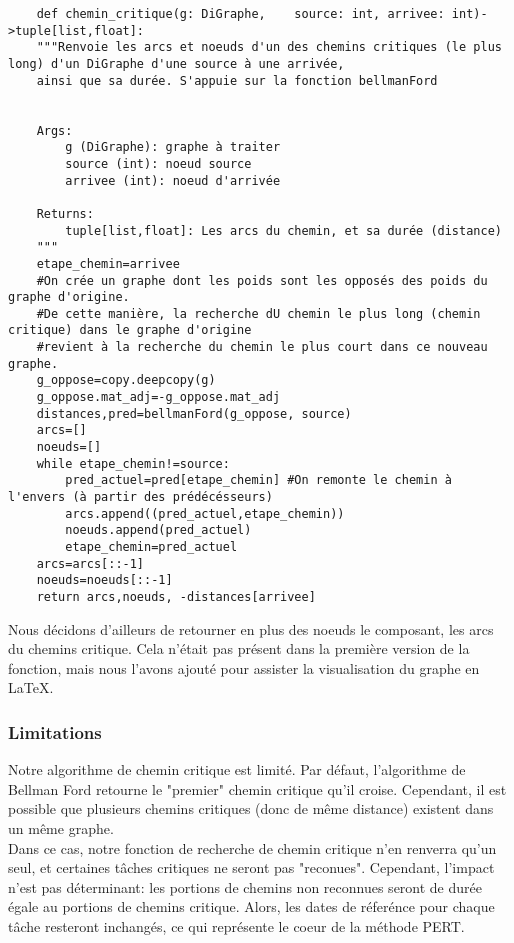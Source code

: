 \documentclass{article}
\begin{document}
\begin{verbatim}
    def chemin_critique(g: DiGraphe,    source: int, arrivee: int)->tuple[list,float]:
    """Renvoie les arcs et noeuds d'un des chemins critiques (le plus long) d'un DiGraphe d'une source à une arrivée,
    ainsi que sa durée. S'appuie sur la fonction bellmanFord


    Args:
        g (DiGraphe): graphe à traiter
        source (int): noeud source
        arrivee (int): noeud d'arrivée

    Returns:
        tuple[list,float]: Les arcs du chemin, et sa durée (distance)
    """
    etape_chemin=arrivee
    #On crée un graphe dont les poids sont les opposés des poids du graphe d'origine.
    #De cette manière, la recherche dU chemin le plus long (chemin critique) dans le graphe d'origine 
    #revient à la recherche du chemin le plus court dans ce nouveau graphe.
    g_oppose=copy.deepcopy(g)
    g_oppose.mat_adj=-g_oppose.mat_adj
    distances,pred=bellmanFord(g_oppose, source)
    arcs=[]
    noeuds=[]
    while etape_chemin!=source: 
        pred_actuel=pred[etape_chemin] #On remonte le chemin à l'envers (à partir des prédécésseurs)
        arcs.append((pred_actuel,etape_chemin))
        noeuds.append(pred_actuel)
        etape_chemin=pred_actuel
    arcs=arcs[::-1]
    noeuds=noeuds[::-1]
    return arcs,noeuds, -distances[arrivee]
\end{verbatim}
Nous décidons d'ailleurs de retourner en plus des noeuds le composant, les arcs du chemins critique.
Cela n'était pas présent dans la première version de la fonction, mais nous l'avons ajouté pour assister 
la visualisation du graphe en \LaTeX.
\subsubsection{Limitations}
Notre algorithme de chemin critique est limité. Par défaut, l'algorithme de Bellman Ford
retourne le "premier" chemin critique qu'il croise. Cependant, il est possible que plusieurs chemins critiques
(donc de même distance) existent dans un même graphe.\\ 
Dans ce cas, notre fonction de recherche de chemin critique n'en renverra qu'un seul, et certaines tâches critiques ne seront pas "reconues".
Cependant, l'impact n'est pas déterminant: les portions de chemins non reconnues seront de durée égale au portions de chemins critique.
Alors, les dates de réferénce pour chaque tâche resteront inchangés, ce qui représente le coeur de la méthode PERT.
\end{document}
